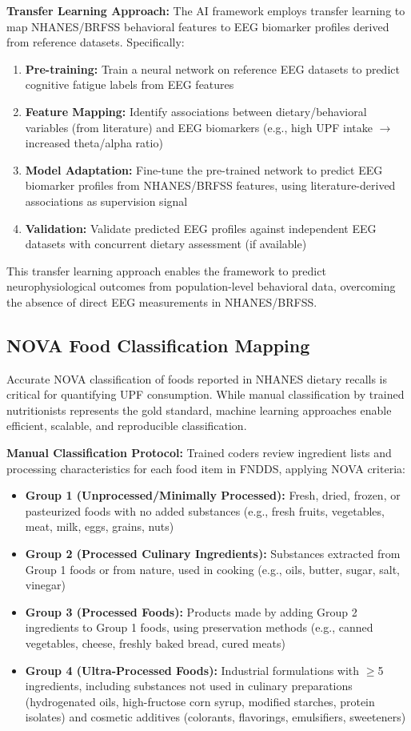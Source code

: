 \documentclass[journal,twoside,10pt]{IEEEtran}
\begin{document}
\textbf{Transfer Learning Approach:}
The AI framework employs transfer learning to map NHANES/BRFSS behavioral features to EEG biomarker profiles derived from reference datasets. Specifically:
\begin{enumerate}
\item \textbf{Pre-training:} Train a neural network on reference EEG datasets to predict cognitive fatigue labels from EEG features
\item \textbf{Feature Mapping:} Identify associations between dietary/behavioral variables (from literature) and EEG biomarkers (e.g., high UPF intake $\rightarrow$ increased theta/alpha ratio)
\item \textbf{Model Adaptation:} Fine-tune the pre-trained network to predict EEG biomarker profiles from NHANES/BRFSS features, using literature-derived associations as supervision signal
\item \textbf{Validation:} Validate predicted EEG profiles against independent EEG datasets with concurrent dietary assessment (if available)
\end{enumerate}

This transfer learning approach enables the framework to predict neurophysiological outcomes from population-level behavioral data, overcoming the absence of direct EEG measurements in NHANES/BRFSS.

\subsection{NOVA Food Classification Mapping}

Accurate NOVA classification of foods reported in NHANES dietary recalls is critical for quantifying UPF consumption. While manual classification by trained nutritionists represents the gold standard, machine learning approaches enable efficient, scalable, and reproducible classification.

\textbf{Manual Classification Protocol:}
Trained coders review ingredient lists and processing characteristics for each food item in FNDDS, applying NOVA criteria:
\begin{itemize}
\item \textbf{Group 1 (Unprocessed/Minimally Processed):} Fresh, dried, frozen, or pasteurized foods with no added substances (e.g., fresh fruits, vegetables, meat, milk, eggs, grains, nuts)
\item \textbf{Group 2 (Processed Culinary Ingredients):} Substances extracted from Group 1 foods or from nature, used in cooking (e.g., oils, butter, sugar, salt, vinegar)
\item \textbf{Group 3 (Processed Foods):} Products made by adding Group 2 ingredients to Group 1 foods, using preservation methods (e.g., canned vegetables, cheese, freshly baked bread, cured meats)
\item \textbf{Group 4 (Ultra-Processed Foods):} Industrial formulations with $\geq$5 ingredients, including substances not used in culinary preparations (hydrogenated oils, high-fructose corn syrup, modified starches, protein isolates) and cosmetic additives (colorants, flavorings, emulsifiers, sweeteners)
\end{itemize}
\end{document}
